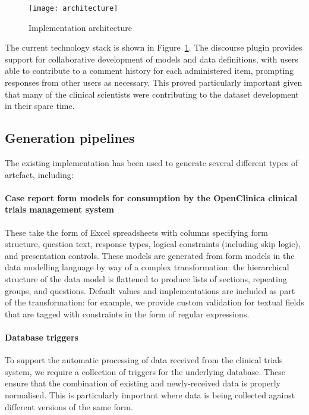 \begin{figure}[here]
  \centering
  \texttt{[image: architecture]}
  \caption{Implementation architecture}
  \label{fig:architecture}
\end{figure}

The current technology stack is shown in
Figure~\ref{fig:architecture}.  The discourse plugin provides support
for collaborative development of models and data definitions, with
users able to contribute to a comment history for each administered
item, prompting responses from other users as necessary.  This proved
particularly important given that many of the clinical scientists were
contributing to the dataset development in their spare time. 

\subsection{Generation pipelines}

The existing implementation has been used to generate several
different types of artefact, including:

\paragraph{Case report form models for consumption by the OpenClinica
  clinical trials management system}  These take the form of Excel
spreadsheets with columns specifying form structure, question text,
response types, logical constraints (including skip logic), and
presentation controls.  These models are generated from form models in
the data modelling language by way of a complex transformation: the
hierarchical structure of the data model is flattened to produce lists
of sections, repeating groups, and questions.  Default values and
implementations are included as part of the transformation: for
example, we provide custom validation for textual fields that are
tagged with constraints in the form of regular expressions.

\paragraph{Database triggers} To support the automatic processing of
data received from the clinical trials system, we require a collection
of triggers for the underlying database.  These ensure that the
combination of existing and newly-received data is properly
normalised.  This is particularly important where data is being
collected against different versions of the same form.

